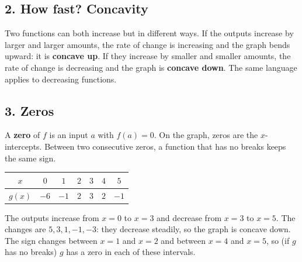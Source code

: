 \subsection*{2. How fast? Concavity}
Two functions can both increase but in different ways. If the outputs increase by larger and larger amounts, the rate of change is increasing and the graph bends upward: it is \textbf{concave up}. If they increase by smaller and smaller amounts, the rate of change is decreasing and the graph is \textbf{concave down}. The same language applies to decreasing functions.

\begin{center}
\quad
{}\quad
{}
\end{center}

\subsection*{3. Zeros}
A \textbf{zero} of $f$ is an input $a$ with $f(a)=0$. On the graph, zeros are the $x$-intercepts. Between two consecutive zeros, a function that has no breaks keeps the same sign.

\begin{example}
\begin{center}\begin{tabular}{c|cccccc}$x$&$0$&$1$&$2$&$3$&$4$&$5$\\\hline$g(x)$&$-6$&$-1$&$2$&$3$&$2$&$-1$\end{tabular}\end{center}
\sol The outputs increase from $x=0$ to $x=3$ and decrease from $x=3$ to $x=5$. The changes are $5,3,1,-1,-3$: they decrease steadily, so the graph is concave down. The sign changes between $x=1$ and $x=2$ and between $x=4$ and $x=5$, so (if $g$ has no breaks) $g$ has a zero in each of these intervals.
\end{example}


